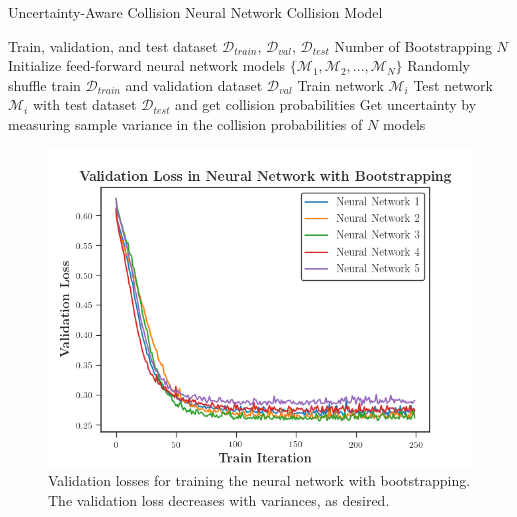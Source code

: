 \begin{algorithm}[t]
	\caption{Uncertainty-Aware Collision Neural Network Collision Model}
	\label{alg:nn-with-bootstrapping}
	\begin{algorithmic}[1]
	    \Require Train, validation, and test dataset $\mathcal{D}_{train}$, $\mathcal{D}_{val}$, $\mathcal{D}_{test}$
	    \Require Number of Bootstrapping $N$
	    \State Initialize feed-forward neural network models $\{\mathcal{M}_{1}, \mathcal{M}_{2}, ..., \mathcal{M}_{N} \}$
	        \State Randomly shuffle train $\mathcal{D}_{train}$ and validation dataset $\mathcal{D}_{val}$
	        \State Train network $\mathcal{M}_{i}$ 
	    \EndFor
	        \State Test network $\mathcal{M}_{i}$ with test dataset $\mathcal{D}_{test}$ and get collision probabilities
	    \EndFor
	    \State Get uncertainty by measuring sample variance in the collision probabilities of $N$ models
	\end{algorithmic}
\end{algorithm}

\begin{figure}[t]
  \centering
  \includegraphics[width=\linewidth]{figures/loss.png}
  \caption{Validation losses for training the neural network with bootstrapping. The validation loss decreases with variances, as desired.}
  \label{fig:ensemble-loss}
\end{figure}

